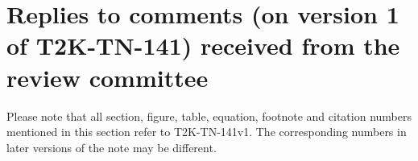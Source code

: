 \section{Replies to comments (on version 1 of T2K-TN-141) received from the review committee}

{\color{red}
Please note that all section, figure, table, equation, footnote and citation 
numbers mentioned in this section refer to T2K-TN-141v1. 
The corresponding numbers in later versions of the note may be different.
}






